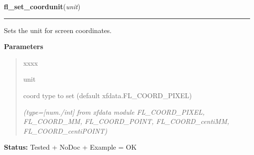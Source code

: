 \hspace{.8\funcindent}\begin{boxedminipage}{\funcwidth}

    \raggedright \textbf{fl\_set\_coordunit}(\textit{unit})

    \vspace{-1.5ex}

    \rule{\textwidth}{0.5\fboxrule}
\setlength{\parskip}{2ex}
    Sets the unit for screen coordinates.

\setlength{\parskip}{1ex}
      \textbf{Parameters}
      \vspace{-1ex}

      \begin{quote}
        \begin{Ventry}{xxxx}

          \item[unit]

          coord type to set (default xfdata.FL\_COORD\_PIXEL)

            {\it (type=[num./int] from xfdata module FL\_COORD\_PIXEL, FL\_COORD\_MM, 
FL\_COORD\_POINT, FL\_COORD\_centiMM, FL\_COORD\_centiPOINT)}

        \end{Ventry}

      \end{quote}

\textbf{Status:} Tested + NoDoc + Example = OK



    \end{boxedminipage}

    \label{xformslib:library:fl_set_border_width}

    \vspace{0.5ex}


